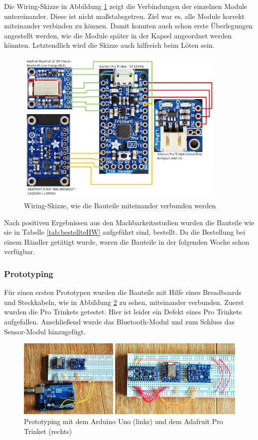 Die Wiring-Skizze in Abbildung \ref{fig:k3_wiringskizze} zeigt die Verbindungen der einzelnen Module untereinander. Diese ist nicht maßstabsgetreu. Ziel war es, alle Module korrekt miteinander verbinden zu können. Damit konnten auch schon erste Überlegungen angestellt werden, wie die Module später in der Kapsel angeordnet werden könnten. Letztendlich wird die Skizze auch hilfreich beim Löten sein.

\begin{figure}[h]
	\centering
	\includegraphics[width=0.9\textwidth]{images/k3-wiringskizze.PNG}
	\caption {Wiring-Skizze, wie die Bauteile miteinander verbunden werden}
	\label{fig:k3_wiringskizze}
\end{figure}

Nach positiven Ergebnissen aus den Machbarkeitsstudien wurden die Bauteile wie sie in Tabelle \ref{tab:bestellteHW} aufgeführt sind, bestellt. Da die Bestellung bei einem Händler getätigt wurde, waren die Bauteile in der folgenden Woche schon verfügbar.
\newpage

\subsubsection{Prototyping}

Für einen ersten Prototypen wurden die Bauteile mit Hilfe eines Breadboards und Steckkabeln, wie in Abbildung \ref{fig:k3_prototyping} zu sehen, miteinander verbunden. Zuerst wurden die Pro Trinkets getestet. Hier ist leider ein Defekt eines Pro Trinkets aufgefallen. Anschließend wurde das Bluetooth-Modul und zum Schluss das Sensor-Modul hinzugefügt.

\begin{figure}[h]
	\centering
	\includegraphics[width=1\textwidth]{images/k3-prototyping.JPG}
	\caption {Prototyping mit dem Arduino Uno (links) und dem Adafruit Pro Trinket (rechts)}
	\label{fig:k3_prototyping}
\end{figure}

